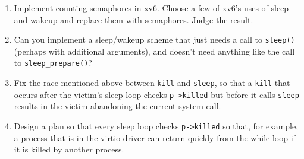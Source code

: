 \begin{enumerate}

\item Implement counting semaphores in xv6.
Choose a few of xv6's uses of sleep and wakeup and
replace them with semaphores.
Judge the result.

\item Can you implement a sleep/wakeup scheme that just
needs a call to {\tt sleep()} (perhaps with additional
arguments), and doesn't need anything like the
call to {\tt sleep\_prepare()}?

\item Fix the race mentioned above between
\lstinline{kill}
and 
\lstinline{sleep},
so that a
\lstinline{kill}
that occurs after the victim's sleep loop checks
\lstinline{p->killed}
but before it calls
\lstinline{sleep}
results in the victim abandoning the current system call.

\item Design a plan so that every sleep loop checks 
\lstinline{p->killed}
so that, for example, a process that is in the virtio driver can return quickly from the while loop
if it is killed by another process.

\end{enumerate}
